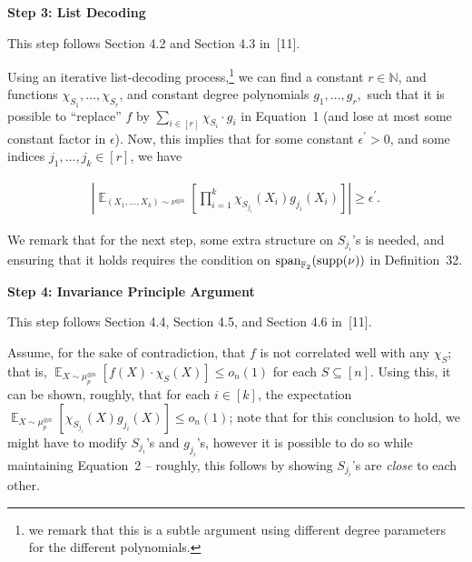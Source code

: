 \documentclass[10pt,a4paper]{article}
\begin{document}
\par\medskip\noindent\textbf{Step 3: List Decoding}\par




This step follows Section 4.2 and Section 4.3 in [11].\par




Using an iterative list-decoding process,\footnote{we remark that this is a subtle argument using different degree parameters for the different polynomials.} we can find a constant $r\in\mathbb{N}$, and functions $\chi_{S_{1}},\dots,\chi_{S_{r}}$, and constant degree polynomials $g_{1},\dots,g_{r},$ such that it is possible to “replace” $f$ by $\sum_{i\in[r]}\chi_{S_{i}}\cdot g_{i}$ in Equation 1 (and lose at most some constant factor in $\epsilon$).
Now, this implies that for some constant $\epsilon^{\prime}>0$, and some indices $j_{1},\dots,j_{k}\in[r]$, we have\par


\[\begin{gathered}
\left|\mathop{\mathbb{E}}_{(X_{1},\dots,X_{k})\sim\nu^{\otimes n}}\left[\prod_{i=1}^{k}\chi_{S_{j_{i}}}(X_{i})g_{j_{i}}(X_{i})\right]\right|\geqslant\epsilon^{\prime}.
\end{gathered}\]


We remark that for the next step, some extra structure on $S_{j_{i}}$’s is needed, and ensuring that it holds requires the condition on $\textnormal{span}_{\mathbb{F}_{2}}(\textnormal{supp}(\nu))$ in Definition 32.\par





\par\medskip\noindent\textbf{Step 4: Invariance Principle Argument}\par




This step follows Section 4.4, Section 4.5, and Section 4.6 in [11].\par




Assume, for the sake of contradiction, that $f$ is not correlated well with any $\chi_{S}$; that is, $\mathop{\mathbb{E}}_{X\sim\mu_{p}^{\otimes n}}\left[f(X)\cdot\chi_{S}(X)\right]\leqslant o_{n}(1)$ for each $S\subseteq[n]$.
Using this, it can be shown, roughly, that for each $i\in[k]$, the expectation $\mathop{\mathbb{E}}_{X\sim\mu_{p}^{\otimes n}}\left[\chi_{S_{j_{i}}}(X)g_{j_{i}}(X)\right]\leqslant o_{n}(1)$; note that for this conclusion to hold, we might have to modify $S_{j_{i}}$’s and $g_{j_{i}}$’s, however it is possible to do so while maintaining Equation 2 – roughly, this follows by showing $S_{j_{i}}$’s are \emph{close} to each other.\par
\end{document}
